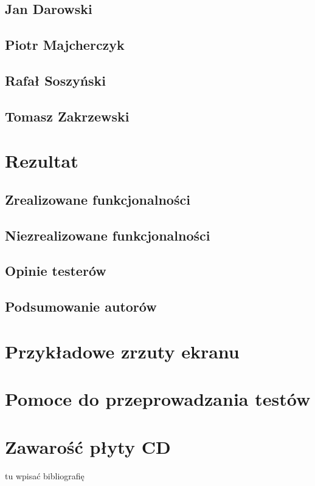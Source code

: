 \documentclass{pracamgr}
\begin{document}
  \section{Jan Darowski}

  \section{Piotr Majcherczyk}

  \section{Rafał Soszyński}

  \section{Tomasz Zakrzewski}

\chapter{Rezultat}

  \section{Zrealizowane funkcjonalności}

  \section{Niezrealizowane funkcjonalności}

  \section{Opinie testerów}

  \section{Podsumowanie autorów}

\appendix

\chapter{Przykładowe zrzuty ekranu}

\chapter{Pomoce do przeprowadzania testów}

\chapter{Zawarość płyty CD}


\begin{thebibliography}{99}

\item{tu wpisać bibliografię}

\end{thebibliography}
\end{document}
